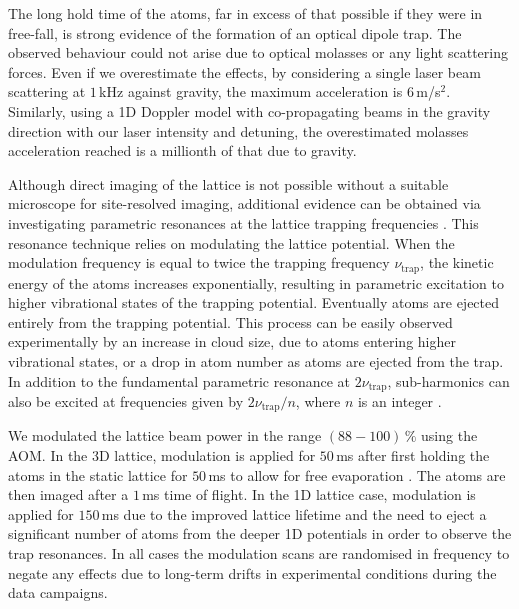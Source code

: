 \documentclass[aps,prl,floatfix,showpacs,twocolumn,amsmath,amssymb,superscriptaddress]{revtex4-2}
\begin{document}
The long hold time of the atoms, far in excess of that possible if they were in free-fall, is strong evidence of the formation of an optical dipole trap. The observed behaviour could not arise due to  optical molasses or any light scattering forces. Even if we overestimate the effects, by considering a single laser beam scattering at $1\,$kHz against gravity, the maximum acceleration is $6\,$m/s$^2$. Similarly, using a 1D Doppler model with co-propagating beams in the gravity direction with our laser intensity and detuning, the overestimated molasses acceleration reached is a millionth of that due to gravity. 

Although direct imaging of the lattice is not possible without a suitable microscope for site-resolved imaging, 
additional evidence can be obtained via investigating parametric resonances at the lattice trapping frequencies  \cite{CO2_1D_lattice_Friebel1998,parametric_oscillation_Wu2006}. This resonance technique relies on modulating the lattice potential. When the modulation frequency is equal to twice the trapping frequency $\nu_\textrm{trap}$, the kinetic energy of the atoms increases exponentially, resulting in parametric excitation to higher vibrational states of the trapping potential. Eventually atoms are ejected entirely from the trapping potential. This process can be easily observed experimentally by an increase in cloud size, due to atoms entering higher vibrational states, or a drop in atom number as atoms are ejected from the trap. In addition to the fundamental parametric resonance at $2\nu_\textrm{trap}$, sub-harmonics can also be excited at frequencies given by $2\nu_\textrm{trap}/n$, where $n$ is an integer \cite{CO2_1D_lattice_Friebel1998}.


We modulated the lattice beam power in the range $(88-100)\,\%$ using the AOM. In the 3D lattice, modulation is applied for $50\,$ms after first holding the atoms in the static lattice for $50\,$ms to allow for free evaporation \cite{Dipole_review_Weidemuller}. The atoms are then imaged after a $1\,$ms time of flight. In the 1D lattice case, modulation is applied for $150\,$ms due to the improved lattice lifetime and the need to eject a significant number of atoms from the deeper 1D potentials in order to observe the trap resonances. In all cases the modulation scans are randomised in frequency to negate any effects due to long-term drifts in experimental conditions during the data campaigns.
\end{document}

